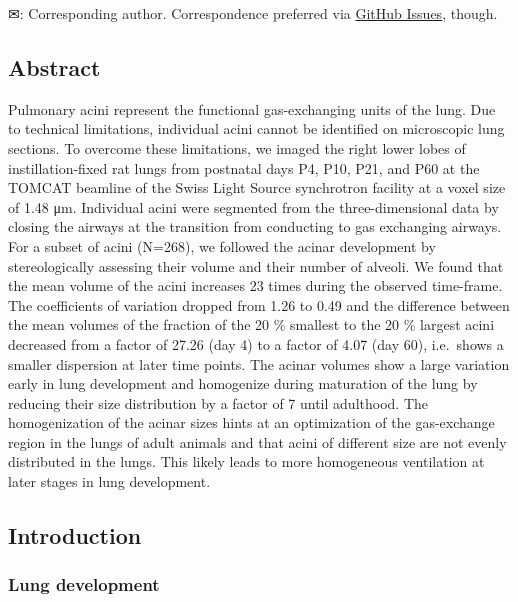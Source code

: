 \documentclass[
  american,
]{article}
\begin{document}
✉: Corresponding author. Correspondence preferred via \href{https://github.com/habi/acinar-analysis-manuscript/issues}{GitHub Issues}, though.

\hypertarget{abstract}{%
\subsection{Abstract}\label{abstract}}

Pulmonary acini represent the functional gas-exchanging units of the lung.
Due to technical limitations, individual acini cannot be identified on microscopic lung sections.
To overcome these limitations, we imaged the right lower lobes of instillation-fixed rat lungs from postnatal days P4, P10, P21, and P60 at the TOMCAT beamline of the Swiss Light Source synchrotron facility at a voxel size of 1.48 μm.
Individual acini were segmented from the three-dimensional data by closing the airways at the transition from conducting to gas exchanging airways.
For a subset of acini (N=268), we followed the acinar development by stereologically assessing their volume and their number of alveoli.
We found that the mean volume of the acini increases 23 times during the observed time-frame.
The coefficients of variation dropped from 1.26 to 0.49 and the difference between the mean volumes of the fraction of the 20 \% smallest to the 20 \% largest acini decreased from a factor of 27.26 (day 4) to a factor of 4.07 (day 60), i.e.~shows a smaller dispersion at later time points.
The acinar volumes show a large variation early in lung development and homogenize during maturation of the lung by reducing their size distribution by a factor of 7 until adulthood.
The homogenization of the acinar sizes hints at an optimization of the gas-exchange region in the lungs of adult animals and that acini of different size are not evenly distributed in the lungs.
This likely leads to more homogeneous ventilation at later stages in lung development.

\hypertarget{introduction}{%
\subsection{Introduction}\label{introduction}}

\hypertarget{lung-development}{%
\subsubsection{Lung development}\label{lung-development}}
\end{document}
